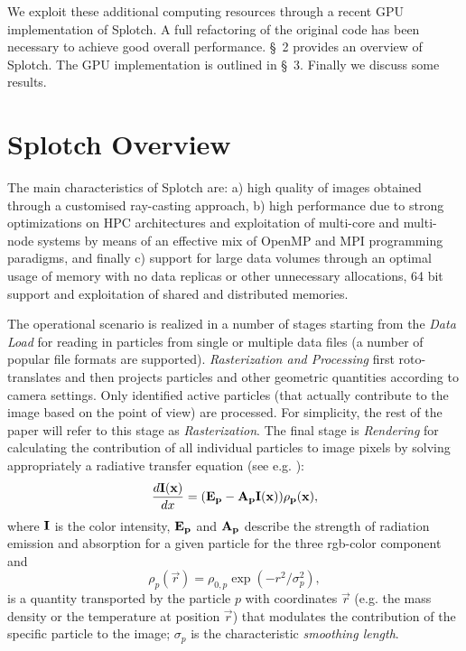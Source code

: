 We exploit these additional computing resources through a recent GPU implementation of Splotch. A full refactoring of the original code has been necessary to achieve good overall performance. \S~2 provides an overview of Splotch. The GPU implementation is outlined in \S~3. Finally we discuss some results.

\section{Splotch Overview}

The main characteristics of Splotch are: a) high quality of images obtained through a customised ray-casting approach, b) high performance due to strong optimizations on HPC architectures and exploitation of multi-core and multi-node systems by means of an effective mix of OpenMP and MPI programming paradigms, and finally c) support for large data volumes through an optimal usage of memory with no data replicas or other unnecessary allocations, 64 bit support and exploitation of shared and distributed memories.

The operational scenario is realized in a number of stages  starting from the {\it Data Load} for reading in particles from single or multiple data files (a number of popular file formats are supported). {\it Rasterization and Processing}  first roto-translates and then projects particles and other geometric quantities according to camera settings. Only identified active particles (that actually contribute to the image based on the point of view) are processed. For simplicity, the rest of the paper will refer to this stage as {\it Rasterization}. The final stage is {\it Rendering} for calculating the contribution of all individual particles to image pixels by solving appropriately a radiative transfer equation (see e.g. \citet{1991par..book.....S}):
\begin{equation}\label{rad}
\frac{d\bf{I}(x)}{dx}=(\bf{E}_p-\bf{A}_p\bf{I}(x))\rho_p(x),
\end{equation}
where $\bf{I}$ is the color intensity, $\bf{E}_p$ and $\bf{A}_p$ describe the strength of radiation emission and absorption for a given particle for the three rgb-color component and 
\begin{equation}\label{smooth}
\rho_p(\vec r)=\rho_{0,p}\exp(-r^2/\sigma_p^2),
\end{equation}
is a quantity transported by the particle $p$ with coordinates $\vec r$ (e.g. the mass density or the temperature at position $\vec r$) that modulates the contribution of the specific particle to the image; $\sigma_p$ is the characteristic {\it smoothing length}.

